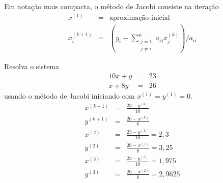 Em notação mais compacta, o método de Jacobi consiste na iteração
\begin{eqnarray}
  x^{(1)}   &=& \text{aproximação inicial}\\
  x_i^{(k+1)} &=& \left(y_i - \sum_{\substack{j=1\\j\ne i}}^{n} a_{ij}x_j^{(k)} \right)/{a_{ii}}
\end{eqnarray}

\begin{ex}
Resolva o sistema
\begin{eqnarray}
 10x+y&=&23\\
 x+8y &=&26
\end{eqnarray}
usando o método de Jacobi iniciando com $x^{(1)}=y^{(1)}=0$.
\begin{eqnarray}
x^{(k+1)}&=&\frac{23-y^{(k)}}{10}\\
y^{(k+1)}&=&\frac{26-x^{(k)}}{8}\\
x^{(2)}&=&\frac{23-y^{(1)}}{10}=2,3\\
y^{(2)}&=&\frac{26-x^{(1)}}{8}=3,25\\
x^{(3)}&=&\frac{23-y^{(2)}}{10}=1,975 \\
y^{(3)}&=&\frac{26-x^{(2)}}{8}=2,9625
\end{eqnarray}
\end{ex}

